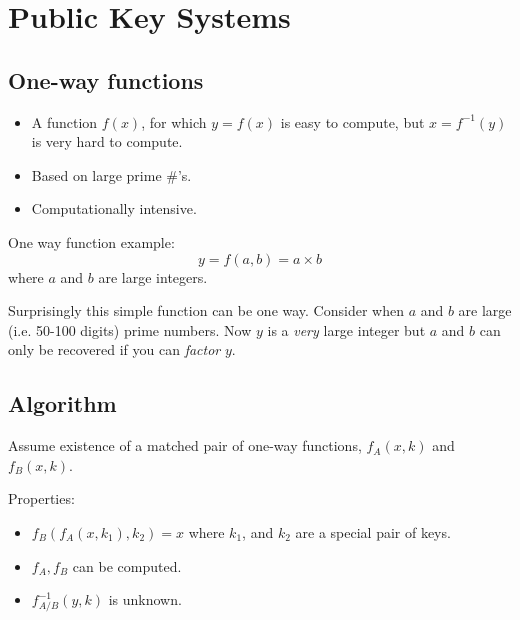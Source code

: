 \section{Public Key Systems}

\subsection{One-way functions}

\begin{itemize}
	\item A function $f(x)$, for which $y = f(x)$ is easy to 
compute, but $x = f^{-1}(y)$ is very hard to compute. 
	\item Based on large prime \#'s.
	\item Computationally intensive.
\end{itemize}

One way function example: 
\[
y = f(a,b) = a \times b
\]
\noindent
where $a$ and $b$ are large integers.

Surprisingly this simple function can be one way.   Consider when $a$ and $b$ are 
large (i.e. 50-100 digits) prime numbers.   Now $y$ is a {\it very} large integer
but $a$ and $b$ can only be recovered if you can {\it factor} $y$.


\subsection{Algorithm}
Assume existence of a matched pair of one-way functions,
$f_A(x,k)$ and $f_B(x,k)$.


Properties:
\begin{itemize}
	\item $f_B(f_A(x,k_1),k_2) = x$
                 where $k_1$, and $k_2$ are a special pair of keys.
        \item $f_A, f_B$ can be computed.
        \item $f^{-1}_{A/B}(y,k)$ is unknown.
\end{itemize}

